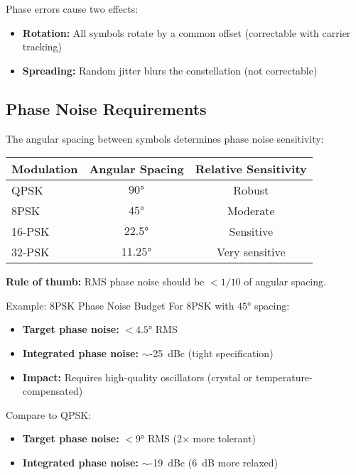 Phase errors cause two effects:
\begin{itemize}
\item \textbf{Rotation:} All symbols rotate by a common offset (correctable with carrier tracking)
\item \textbf{Spreading:} Random jitter blurs the constellation (not correctable)
\end{itemize}

\subsection{Phase Noise Requirements}

The angular spacing between symbols determines phase noise sensitivity:

\begin{center}
\begin{tabular}{@{}lcc@{}}
\toprule
Modulation & Angular Spacing & Relative Sensitivity \\
\midrule
QPSK & $90°$ & Robust \\
8PSK & $45°$ & Moderate \\
16-PSK & $22.5°$ & Sensitive \\
32-PSK & $11.25°$ & Very sensitive \\
\bottomrule
\end{tabular}
\end{center}

\textbf{Rule of thumb:} RMS phase noise should be $< 1/10$ of angular spacing.

\begin{calloutbox}{Example: 8PSK Phase Noise Budget}
For 8PSK with $45°$ spacing:
\begin{itemize}
\item \textbf{Target phase noise:} $< 4.5°$ RMS
\item \textbf{Integrated phase noise:} $\sim$-25~dBc (tight specification)
\item \textbf{Impact:} Requires high-quality oscillators (crystal or temperature-compensated)
\end{itemize}

Compare to QPSK:
\begin{itemize}
\item \textbf{Target phase noise:} $< 9°$ RMS (2$\times$ more tolerant)
\item \textbf{Integrated phase noise:} $\sim$-19~dBc (6~dB more relaxed)
\end{itemize}
\end{calloutbox}


